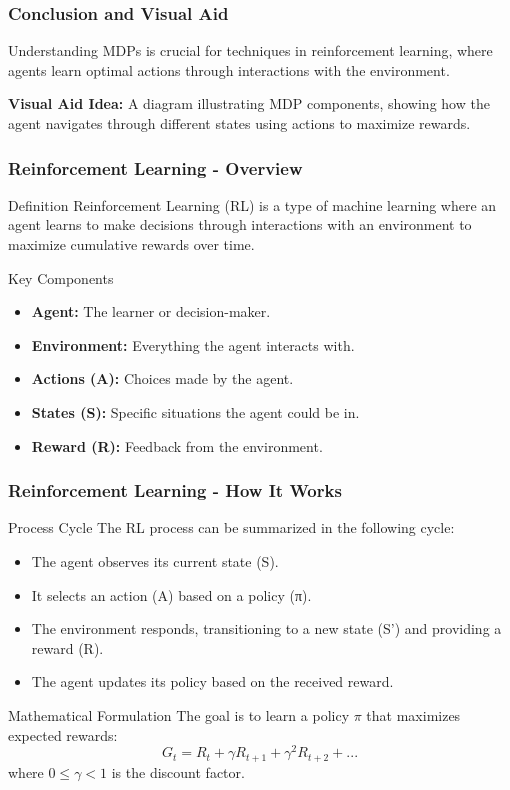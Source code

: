 \documentclass[aspectratio=169]{beamer}
\begin{document}
\begin{frame}[fragile]
  \frametitle{Conclusion and Visual Aid}
  Understanding MDPs is crucial for techniques in reinforcement learning, where agents learn optimal actions through interactions with the environment. 

  \textbf{Visual Aid Idea:} A diagram illustrating MDP components, showing how the agent navigates through different states using actions to maximize rewards.
\end{frame}

\begin{frame}[fragile]
  \frametitle{Reinforcement Learning - Overview}
  \begin{block}{Definition}
    Reinforcement Learning (RL) is a type of machine learning where an agent learns to make decisions through interactions with an environment to maximize cumulative rewards over time.
  \end{block}
  
  \begin{block}{Key Components}
    \begin{itemize}
      \item \textbf{Agent:} The learner or decision-maker.
      \item \textbf{Environment:} Everything the agent interacts with.
      \item \textbf{Actions (A):} Choices made by the agent.
      \item \textbf{States (S):} Specific situations the agent could be in.
      \item \textbf{Reward (R):} Feedback from the environment.
    \end{itemize}
  \end{block}
\end{frame}

\begin{frame}[fragile]
  \frametitle{Reinforcement Learning - How It Works}
  \begin{block}{Process Cycle}
    The RL process can be summarized in the following cycle:
    \begin{itemize}
      \item The agent observes its current state (S).
      \item It selects an action (A) based on a policy (π).
      \item The environment responds, transitioning to a new state (S') and providing a reward (R).
      \item The agent updates its policy based on the received reward.
    \end{itemize}
  \end{block}
  
  \begin{block}{Mathematical Formulation}
    The goal is to learn a policy \( \pi \) that maximizes expected rewards:
    \begin{equation}
    G_t = R_t + \gamma R_{t+1} + \gamma^2 R_{t+2} + ... 
    \end{equation}
    where \( 0 \leq \gamma < 1 \) is the discount factor.
  \end{block}
\end{frame}
\end{document}
